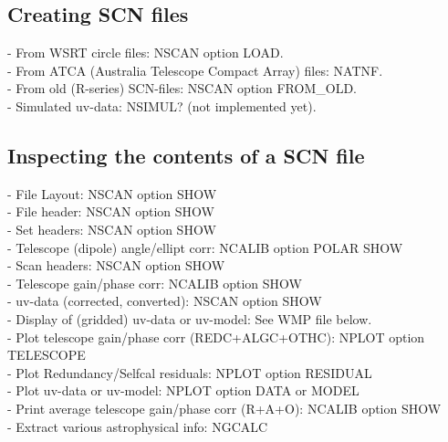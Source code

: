 
\subsection{Creating SCN files} 
\label{scn.create} 

- From WSRT circle files: NSCAN option LOAD. \\ 
- From ATCA (Australia Telescope Compact Array) files: NATNF.\\ 
- From old (R-series) SCN-files: NSCAN option FROM\_OLD.\\ 
- Simulated uv-data: NSIMUL? (not implemented yet).\\ 


\subsection{Inspecting the contents of a SCN file} 
\label{scn.inspect} 

- File Layout: NSCAN option SHOW\\ 
- File header: NSCAN option SHOW\\ 
- Set headers: NSCAN option SHOW\\ 
\hspace*{5mm} - Telescope (dipole) angle/ellipt corr: NCALIB option POLAR 
SHOW\\
- Scan headers: NSCAN option SHOW\\ 
\hspace*{5mm} - Telescope gain/phase corr: NCALIB option SHOW\\ 
- uv-data (corrected, converted): NSCAN option SHOW\\ 
- Display of (gridded) uv-data or uv-model: See WMP file below.\\ 
- Plot telescope gain/phase corr (REDC+ALGC+OTHC): NPLOT option TELESCOPE\\ 
- Plot Redundancy/Selfcal residuals: NPLOT option RESIDUAL\\ 
- Plot uv-data or uv-model: NPLOT option DATA or MODEL\\ 
- Print average telescope gain/phase corr (R+A+O): NCALIB option SHOW\\ 
- Extract various astrophysical info: NGCALC\\ 



